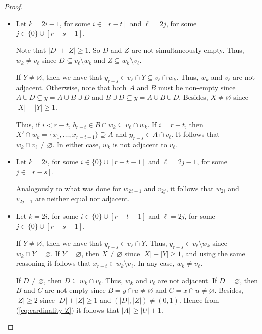 \documentclass[a4paper,11pt]{article}
\renewcommand{\emptyset}{\varnothing}
\begin{document}
\begin{proof}
\begin{description}
\begin{itemize}
            \item Let $k=2i-1$, for some $i\in [r-t]$ and $\ell=2j$, for some $j\in \{0\}\cup [r-s-1]$.

                Note that $|D|+|Z|\geq 1$. So $D$ and $Z$ are not simultaneously empty. Thus, $w_k\neq v_\ell$ since $D\subseteq v_\ell\setminus w_k$ and $Z\subseteq w_k\setminus v_\ell$.
        
                If $Y\neq \emptyset$, then we have that $y_{r-s}\in v_\ell\cap Y\subseteq v_\ell\cap w_k$. Thus, $w_k$ and $v_\ell$ are not adjacent. 
                Otherwise, note that both $A$ and $B$ must be non-empty since $A\cup D\subsetneq y=A\cup B\cup D$ and $B\cup D\subsetneq y=A\cup B\cup D$. Besides, $X\neq \emptyset$ since $|X|+|Y|\geq 1$. 
                
                Thus, if $i<r-t$, $b_{r-t}\in B\cap w_k\subseteq v_\ell\cap w_k$. 
                If $i=r-t$, then $X'\cap w_k = \{x_1,\ldots,x_{r-t-1}\}\supseteq A$ and $y_{r-s}\in A\cap v_\ell$. It follows that $w_k\cap v_\ell\neq \emptyset$. In either case, $w_k$ is not adjacent to $v_\ell$.
            
            \item Let $k=2i$, for some $i\in \{0\}\cup [r-t-1]$ and $\ell=2j-1$, for some $j\in [r-s]$.

                Analogously to what was done for $w_{2i-1}$ and $v_{2j}$, it follows that $w_{2i}$ and $v_{2j-1}$ are neither equal nor adjacent.
            
            \item Let $k=2i$, for some $i\in \{0\}\cup [r-t-1]$ and $\ell=2j$, for some $j\in \{0\}\cup [r-s-1]$.

                If $Y\neq \emptyset$, then we have that $y_{r-s}\in v_\ell \cap Y$. Thus, $y_{r-s}\in v_\ell\setminus w_k$ since $w_k\cap Y=\emptyset$. If $Y=\emptyset$, then $X\neq\emptyset$ since $|X|+|Y|\geq 1$, and using the same reasoning it follows that $x_{r-t}\in w_k\setminus v_\ell$. In any case, $w_k\neq v_\ell$.

                If $D\neq \emptyset$, then $D\subseteq w_k\cap v_\ell$. Thus, $w_k$ and $v_\ell$ are not adjacent.
                If $D= \emptyset$, then $B$ and $C$ are not empty since $B=y\cap u\neq \emptyset$ and $C=x\cap u\neq \emptyset$. Besides, $|Z|\geq 2$ since $|D|+|Z|\geq 1$ and $(|D|,|Z|)\neq (0,1)$. Hence from (\ref{eq:cardinality Z}) it follows that $|A|\geq |U|+1$.
                

\end{itemize}
\end{description}
\end{proof}
\end{document}

